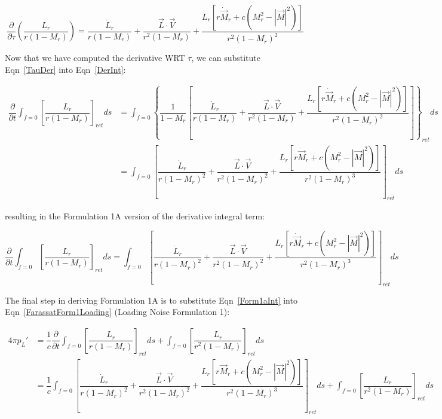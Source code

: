 \documentclass[]{aiaa-tc}%
\begin{document}
\begin{equation} \label{TauDer}
\dfrac{\partial}{\partial \tau} \left( \dfrac{L_r}{r (1 - M_r)}  \right)
= \dfrac{\dot{L}_r}{r (1 - M_r)}
    + \dfrac{\vec{L}\cdot\vec{V}}{r^2 (1 - M_r)}
    + \dfrac{ L_r \left[
        r\dot{\vec{M}}_r + c \left( M_r^2 - |\vec{M}|^2 \right) \right] }
        {r^2 (1 - M_r)^2}
\end{equation}

Now that we have computed the derivative WRT $\tau$, we can substitute Eqn~\ref{TauDer} into Eqn~\ref{DerInt}:

\begin{align*}
\dfrac{\partial}{\partial t}
      \int_{f=0} \left[ \dfrac{L_r}{r   (1 - M_r)} \right]_{ret} ds
&= \int_{f=0} \left\{
    \dfrac{1}{1 - M_r} \left[
    \dfrac{\dot{L}_r}{r (1 - M_r)}
    + \dfrac{\vec{L}\cdot\vec{V}}{r^2 (1 - M_r)}
    + \dfrac{ L_r \left[
        r\dot{\vec{M}}_r + c \left( M_r^2 - |\vec{M}|^2 \right) \right] }
        {r^2 (1 - M_r)^2} \right]
    \right\}_{ret} ds \\
&= \int_{f=0} \left[
    \dfrac{\dot{L}_r}{r (1 - M_r)^2}
    + \dfrac{\vec{L}\cdot\vec{V}}{r^2 (1 - M_r)^2}
    + \dfrac{ L_r \left[
        r\dot{\vec{M}}_r + c \left( M_r^2 - |\vec{M}|^2 \right) \right] }
        {r^2 (1 - M_r)^3}
    \right]_{ret} ds
\end{align*}

\noindent resulting in the Formulation 1A version of the derivative integral term:

\begin{equation} \label{Form1aInt}
\dfrac{\partial}{\partial t}
      \int_{f=0} \left[ \dfrac{L_r}{r   (1 - M_r)} \right]_{ret} ds
= \int_{f=0} \left[
    \dfrac{\dot{L}_r}{r (1 - M_r)^2}
    + \dfrac{\vec{L}\cdot\vec{V}}{r^2 (1 - M_r)^2}
    + \dfrac{ L_r \left[
        r\dot{\vec{M}}_r + c \left( M_r^2 - |\vec{M}|^2 \right) \right] }
        {r^2 (1 - M_r)^3}
    \right]_{ret} ds
\end{equation}

The final step in deriving Formulation 1A is to substitute Eqn~\ref{Form1aInt} into Eqn~\ref{FarassatForm1Loading} (Loading Noise Formulation 1):

\begin{align*}
4\pi p_{L}' &= \dfrac{1}{c} \dfrac{\partial}{\partial t}
      \int_{f=0} \left[ \dfrac{L_r}{r   (1 - M_r)} \right]_{ret} ds
    + \int_{f=0} \left[ \dfrac{L_r}{r^2 (1 - M_r)} \right]_{ret} ds \\
&= \dfrac{1}{c} \int_{f=0} \left[
    \dfrac{\dot{L}_r}{r (1 - M_r)^2}
    + \dfrac{\vec{L}\cdot\vec{V}}{r^2 (1 - M_r)^2}
    + \dfrac{ L_r \left[
        r\dot{\vec{M}}_r + c \left( M_r^2 - |\vec{M}|^2 \right) \right] }
        {r^2 (1 - M_r)^3}
    \right]_{ret} ds
    + \int_{f=0} \left[ \dfrac{L_r}{r^2 (1 - M_r)} \right]_{ret} ds
\end{align*}
\end{document}

